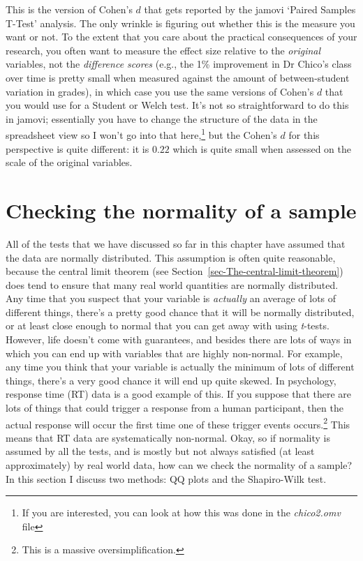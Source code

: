 \documentclass[
  a4paper,
]{book}
\begin{document}
This is the version of Cohen's \(d\) that gets reported by the jamovi
`Paired Samples T-Test' analysis. The only wrinkle is figuring out
whether this is the measure you want or not. To the extent that you care
about the practical consequences of your research, you often want to
measure the effect size relative to the \emph{original} variables, not
the \emph{difference scores} (e.g., the 1\% improvement in Dr Chico's
class over time is pretty small when measured against the amount of
between-student variation in grades), in which case you use the same
versions of Cohen's \(d\) that you would use for a Student or Welch
test. It's not so straightforward to do this in jamovi; essentially you
have to change the structure of the data in the spreadsheet view so I
won't go into that here,\footnote{If you are interested, you can look at
  how this was done in the \emph{chico2.omv} file} but the Cohen's \(d\)
for this perspective is quite different: it is \(0.22\) which is quite
small when assessed on the scale of the original variables.

\hypertarget{sec-Checking-the-normality-of-a-sample}{%
\section{Checking the normality of a
sample}\label{sec-Checking-the-normality-of-a-sample}}

All of the tests that we have discussed so far in this chapter have
assumed that the data are normally distributed. This assumption is often
quite reasonable, because the central limit theorem (see
Section~\ref{sec-The-central-limit-theorem}) does tend to ensure that
many real world quantities are normally distributed. Any time that you
suspect that your variable is \emph{actually} an average of lots of
different things, there's a pretty good chance that it will be normally
distributed, or at least close enough to normal that you can get away
with using \emph{t}-tests. However, life doesn't come with guarantees,
and besides there are lots of ways in which you can end up with
variables that are highly non-normal. For example, any time you think
that your variable is actually the minimum of lots of different things,
there's a very good chance it will end up quite skewed. In psychology,
response time (RT) data is a good example of this. If you suppose that
there are lots of things that could trigger a response from a human
participant, then the actual response will occur the first time one of
these trigger events occurs.\footnote{This is a massive
  oversimplification.} This means that RT data are systematically
non-normal. Okay, so if normality is assumed by all the tests, and is
mostly but not always satisfied (at least approximately) by real world
data, how can we check the normality of a sample? In this section I
discuss two methods: QQ plots and the Shapiro-Wilk test.
\end{document}
